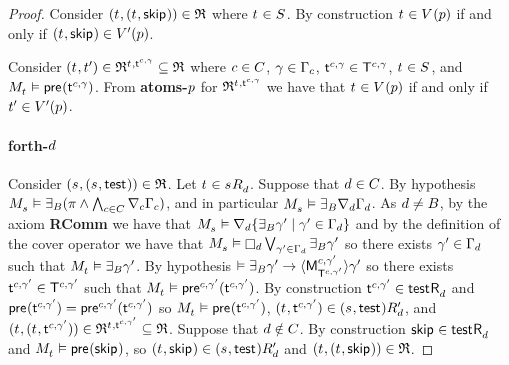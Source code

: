 \begin{proof}
Consider $(\kStateT, (\kStateT, \aStateSkip)) \in \refinement$ where $\kStateT \in \kStates$.
By construction $\kStateT \in \kValuation(\atomP)$ if and only if $(\kStateT, \aStateSkip) \in \kValuationP(\atomP)$.

Consider $(\kStateT, \kStateTP) \in \refinement^{\kStateT, \aStateT[\agentC, \gamma]} \subseteq \refinement$ where $\agentC \in \agentsC$, $\gamma \in \Gamma_\agentC$, $\aStateT[\agentC, \gamma] \in \aStatesT[\agentC, \gamma]$, $\kStateT \in \kStates$, and $\kPModel{\kStateT} \entails \aPrecondition(\aStateT[\agentC, \gamma])$.
From {\bf atoms-$\atomP$} for $\refinement^{\kStateT, \aStateT[\agentC, \gamma]}$ we have that $\kStateT \in \kValuation(\atomP)$ if and only if $\kStateTP \in \kValuationP(\atomP)$.

\paragraph{forth-$\agentD$}
Consider $(\kStateS, (\kStateS, \aStateTest)) \in \refinement$.
Let $\kStateT \in \kSuccessorsD{\kStateS}$.
Suppose that $\agentD \in \agentsC$.
By hypothesis $\kPModel{\kStateS} \entails \someactsBs (\pi \land \bigwedge_{\agentC \in \agentsC} \coversC \Gamma_\agentC)$, and in particular $\kPModel{\kStateS} \entails \someactsBs \coversD \Gamma_\agentD$.
As $\agentD \neq \agentsB$, by the \axiomAamlK{} axiom {\bf RComm} we have that $\kPModel{\kStateS} \entails \coversD \{\someactsBs \gamma' \mid \gamma' \in \Gamma_\agentD\}$ and by the definition of the cover operator we have that $\kPModel{\kStateS} \entails \necessaryD \bigvee_{\gamma' \in \Gamma_\agentD} \someactsBs \gamma'$ so there exists $\gamma' \in \Gamma_\agentD$ such that $\kPModel{\kStateT} \entails \someactsBs \gamma'$.
By hypothesis $\entails \someactsBs \gamma' \implies \actionE{\aPModel[\agentC, \gamma']{\aStatesT[\agentC, \gamma']}} \gamma'$ so there exists $\aStateT[\agentC, \gamma'] \in \aStatesT[\agentC, \gamma']$ such that $\kPModel{\kStateT} \entails \aPrecondition[\agentC, \gamma'](\aStateT[\agentC, \gamma'])$.
By construction $\aStateT[\agentC, \gamma'] \in \aSuccessorsD{\aStateTest}$ and $\aPrecondition(\aStateT[\agentC, \gamma']) = \aPrecondition[\agentC, \gamma'](\aStateT[\agentC, \gamma'])$ so $\kPModel{\kStateT} \entails \aPrecondition(\aStateT[\agentC, \gamma'])$, $(\kStateT, \aStateT[\agentC, \gamma']) \in \kSuccessorsPD{(\kStateS, \aStateTest)}$, and $(\kStateT, (\kStateT, \aStateT[\agentC, \gamma'])) \in \refinement^{\kStateT, \aStateT[\agentC, \gamma']} \subseteq \refinement$.
Suppose that $\agentD \notin \agentsC$.
By construction $\aStateSkip \in \aSuccessorsD{\aStateTest}$ and $\kPModel{\kStateT} \entails \aPrecondition(\aStateSkip)$, so $(\kStateT, \aStateSkip) \in \kSuccessorsPD{(\kStateS, \aStateTest)}$ and $(\kStateT, (\kStateT, \aStateSkip)) \in \refinement$.


\end{proof}
